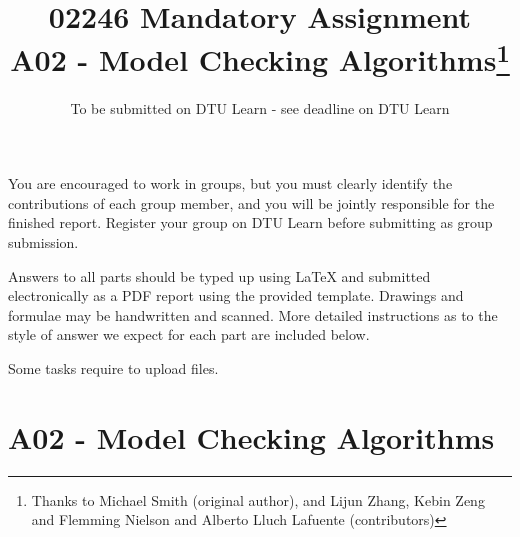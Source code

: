 \documentclass[12pt,a4paper]{article}
\title{02246 Mandatory Assignment\\
A02 - Model Checking Algorithms\footnote{Thanks to Michael Smith (original author), and Lijun Zhang, Kebin Zeng and Flemming Nielson and Alberto Lluch Lafuente (contributors)}}
\date{To be submitted on DTU Learn - see deadline on DTU Learn}
\begin{document}
\maketitle

\noindent
You are encouraged to work in groups, 
but you must clearly identify the contributions of each group member, and you will be jointly responsible for the finished report. Register your group on DTU Learn before submitting as group submission. 
\par
Answers to all parts should be typed up using LaTeX and submitted electronically as a PDF report using the provided template. Drawings and formulae may be handwritten
and scanned. More detailed instructions as to the style of answer we expect for each part are included below.
\par
Some tasks require to upload files. %


\clearpage

\section*{A02 - Model Checking Algorithms}

\newif\ifwithanswers
\withanswerstrue
\end{document}
